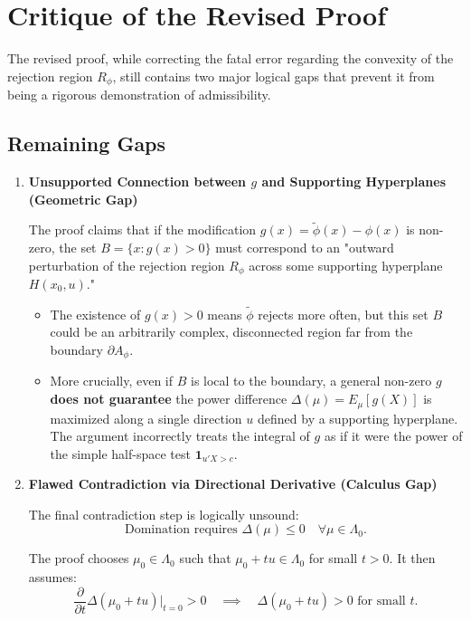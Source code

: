 \documentclass[12pt]{article}
\begin{document}
\section*{Critique of the Revised Proof}

The revised proof, while correcting the fatal error regarding the convexity of the rejection region $R_\phi$, still contains two major logical gaps that prevent it from being a rigorous demonstration of admissibility.

\subsection{Remaining Gaps}

\begin{enumerate}
    \item \textbf{Unsupported Connection between $g$ and Supporting Hyperplanes (Geometric Gap)}
    
    The proof claims that if the modification $g(x) = \tilde{\phi}(x) - \phi(x)$ is non-zero, the set $B = \{x : g(x) > 0\}$ must correspond to an "outward perturbation of the rejection region $R_\phi$ across some supporting hyperplane $H(x_0,u)$."
    
    \begin{itemize}
        \item The existence of $g(x) > 0$ means $\tilde{\phi}$ rejects more often, but this set $B$ could be an arbitrarily complex, disconnected region far from the boundary $\partial A_\phi$.
        \item More crucially, even if $B$ is local to the boundary, a general non-zero $g$ \textbf{does not guarantee} the power difference $\Delta(\mu) = E_\mu[g(X)]$ is maximized along a single direction $u$ defined by a supporting hyperplane. The argument incorrectly treats the integral of $g$ as if it were the power of the simple half-space test $\mathbf{1}_{u'X>c}$.
    \end{itemize}
    
    \item \textbf{Flawed Contradiction via Directional Derivative (Calculus Gap)}
    
    The final contradiction step is logically unsound:
    $$
    \text{Domination requires } \Delta(\mu) \le 0 \quad \forall \mu \in \Lambda_0.
    $$
    
    The proof chooses $\mu_0 \in \Lambda_0$ such that $\mu_0 + tu \in \Lambda_0$ for small $t>0$. It then assumes:
    $$
    \frac{\partial}{\partial t}\Delta(\mu_0 + t u)\Big|_{t=0} > 0 \quad \implies \quad \Delta(\mu_0 + t u) > 0 \text{ for small } t.
    $$
    

\end{enumerate}
\end{document}
